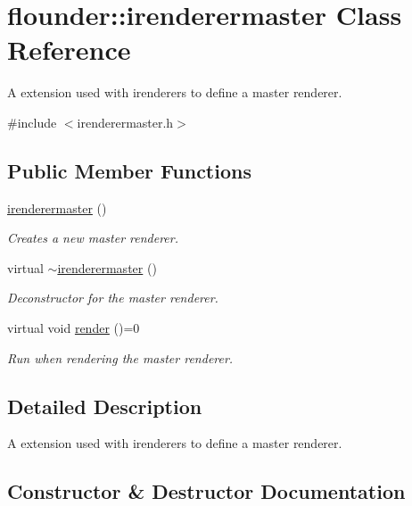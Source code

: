 \hypertarget{classflounder_1_1irenderermaster}{}\section{flounder\+:\+:irenderermaster Class Reference}
\label{classflounder_1_1irenderermaster}


A extension used with irenderers to define a master renderer.  




{\ttfamily \#include $<$irenderermaster.\+h$>$}

\subsection*{Public Member Functions}
\begin{DoxyCompactItemize}
\item 
\hyperlink{classflounder_1_1irenderermaster_aa444df0403191efaa767e4f6b7aa9c5f}{irenderermaster} ()
\begin{DoxyCompactList}\small\item\em Creates a new master renderer. \end{DoxyCompactList}\item 
virtual \hyperlink{classflounder_1_1irenderermaster_a4e83c1d1dafc479ea14392edcd131c73}{$\sim$irenderermaster} ()
\begin{DoxyCompactList}\small\item\em Deconstructor for the master renderer. \end{DoxyCompactList}\item 
virtual void \hyperlink{classflounder_1_1irenderermaster_ae5719349eb4b111889156f9560d9c3e0}{render} ()=0
\begin{DoxyCompactList}\small\item\em Run when rendering the master renderer. \end{DoxyCompactList}\end{DoxyCompactItemize}


\subsection{Detailed Description}
A extension used with irenderers to define a master renderer. 



\subsection{Constructor \& Destructor Documentation}
\mbox{\label{classflounder_1_1irenderermaster_aa444df0403191efaa767e4f6b7aa9c5f}} 
